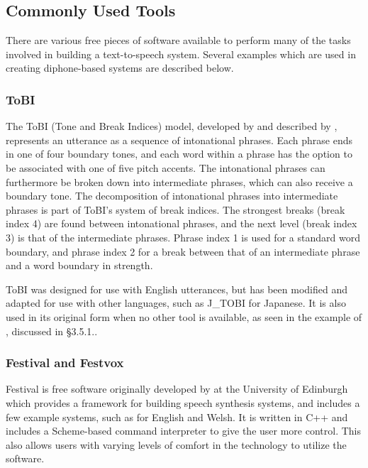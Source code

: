 \documentclass[12pt]{article}
\begin{document}
	\subsection{Commonly Used Tools}

	There are various free pieces of software available to perform many of the tasks involved in building a text-to-speech system. Several examples which are used in creating diphone-based systems are described below. \par

		\subsubsection{ToBI}
		The ToBI (Tone and Break Indices) model, developed by \citet{tobi} and described by \citet{slp}, represents an utterance as a sequence of intonational phrases. Each phrase ends in one of four boundary tones, and each word within a phrase has the option to be associated with one of five pitch accents. The intonational phrases can furthermore be broken down into intermediate phrases, which can also receive a boundary tone. The decomposition of intonational phrases into intermediate phrases is part of ToBI's system of break indices. The strongest breaks (break index 4) are found between intonational phrases, and the next level (break index 3) is that of the intermediate phrases. Phrase index 1 is used for a standard word boundary, and phrase index 2 for a break between that of an intermediate phrase and a word boundary in strength. \par

		ToBI was designed for use with English utterances, but has been modified and adapted for use with other languages, such as J\_TOBI for Japanese. It is also used in its original form when no other tool is available, as seen in the example of \citet{mongolian}, discussed in \S 3.5.1.. \par

		\subsubsection{Festival and Festvox}
		Festival is free software originally developed by \citet{festival} at the University of Edinburgh which provides a framework for building speech synthesis systems, and includes a few example systems, such as for English and Welsh. It is written in C++ and includes a Scheme-based command interpreter to give the user more control. This also allows users with varying levels of comfort in the technology to utilize the software. \par
\end{document}

